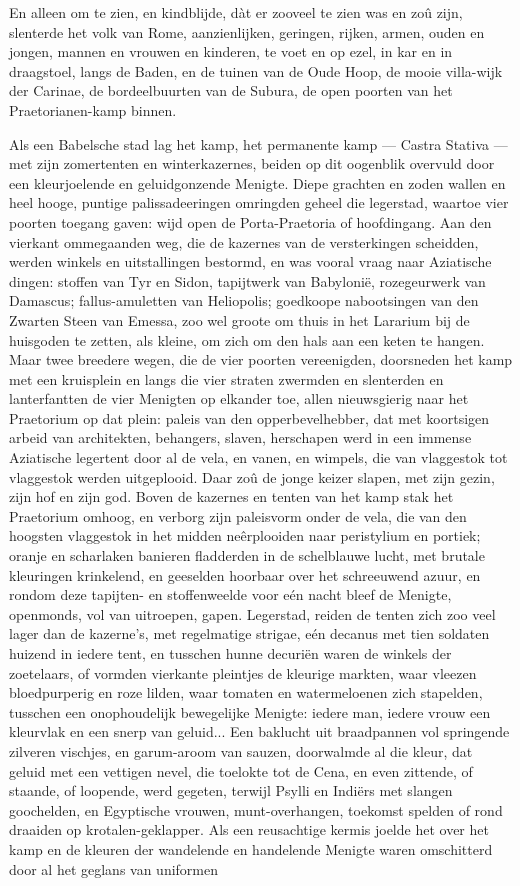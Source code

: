 \documentclass[a4paper, 12pt, oneside, dutch]{article}
\begin{document}
En alleen om te zien, en kindblijde, dàt er zooveel te zien was en zoû zijn, slenterde het volk van Rome, aanzienlijken, geringen, rijken, armen, ouden en jongen, mannen en vrouwen en kinderen, te voet en op ezel, in kar en in draagstoel, langs de Baden, en de tuinen van de Oude Hoop, de mooie villa-wijk der Carinae, de bordeelbuurten van de Subura, de open poorten van het Praetorianen-kamp binnen.

Als een Babelsche stad lag het kamp, het permanente kamp --- Castra Stativa --- met zijn zomertenten en winterkazernes, beiden op dit oogenblik overvuld door een kleurjoelende en geluidgonzende Menigte. Diepe grachten en zoden wallen en heel hooge, puntige palissadeeringen omringden geheel die legerstad, waartoe vier poorten toegang gaven: wijd open de Porta-Praetoria of hoofdingang. Aan den vierkant ommegaanden weg, die de kazernes van de versterkingen scheidden, werden winkels en uitstallingen bestormd, en was vooral vraag naar Aziatische dingen: stoffen van Tyr en Sidon, tapijtwerk van Babylonië, rozegeurwerk van Damascus; fallus-amuletten van Heliopolis; goedkoope nabootsingen van den Zwarten Steen van Emessa, zoo wel groote om thuis in het Lararium bij de huisgoden te zetten, als kleine, om zich om den hals aan een keten te hangen. Maar twee breedere wegen, die de vier poorten vereenigden, doorsneden het kamp met een kruisplein en langs die vier straten zwermden en slenterden en lanterfantten de vier Menigten op elkander toe, allen nieuwsgierig naar het Praetorium op dat plein: paleis van den opperbevelhebber, dat met koortsigen arbeid van architekten, behangers, slaven, herschapen werd in een immense Aziatische legertent door al de vela, en vanen, en wimpels, die van vlaggestok tot vlaggestok werden uitgeplooid. Daar zoû de jonge keizer slapen, met zijn gezin, zijn hof en zijn god. Boven de kazernes en tenten van het kamp stak het Praetorium omhoog, en verborg zijn paleisvorm onder de vela, die van den hoogsten vlaggestok in het midden neêrplooiden naar peristylium en portiek; oranje en scharlaken banieren fladderden in de schelblauwe lucht, met brutale kleuringen krinkelend, en geeselden hoorbaar over het schreeuwend azuur, en rondom deze tapijten- en stoffenweelde voor eén nacht bleef de Menigte, openmonds, vol van uitroepen, gapen. Legerstad, reiden de tenten zich zoo veel lager dan de kazerne's, met regelmatige strigae, eén decanus met tien soldaten huizend in iedere tent, en tusschen hunne decuriën waren de winkels der zoetelaars, of vormden vierkante pleintjes de kleurige markten, waar vleezen bloedpurperig en roze lilden, waar tomaten en watermeloenen zich stapelden, tusschen een onophoudelijk bewegelijke Menigte: iedere man, iedere vrouw een kleurvlak en een snerp van geluid... Een baklucht uit braadpannen vol springende zilveren vischjes, en garum-aroom van sauzen, doorwalmde al die kleur, dat geluid met een vettigen nevel, die toelokte tot de Cena, en even zittende, of staande, of loopende, werd gegeten, terwijl Psylli en Indiërs met slangen goochelden, en Egyptische vrouwen, munt-overhangen, toekomst spelden of rond draaiden op krotalen-geklapper. Als een reusachtige kermis joelde het over het kamp en de kleuren der wandelende en handelende Menigte waren omschitterd door al het geglans van uniformen 
\end{document}

